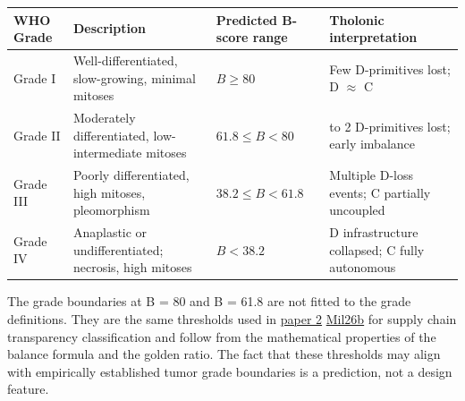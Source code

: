 \documentclass[
  11pt,
  letterpaper,
]{article}
\begin{document}
\begin{longtable}[]{@{}
  >{\raggedright\arraybackslash}p{}
  >{\raggedright\arraybackslash}p{}
  >{\raggedright\arraybackslash}p{}
  >{\raggedright\arraybackslash}p{}@{}}
\toprule\noalign{}
\begin{minipage}[b]{\linewidth}\raggedright
WHO Grade
\end{minipage} & \begin{minipage}[b]{\linewidth}\raggedright
Description
\end{minipage} & \begin{minipage}[b]{\linewidth}\raggedright
Predicted B-score range
\end{minipage} & \begin{minipage}[b]{\linewidth}\raggedright
Tholonic interpretation
\end{minipage} \\
\midrule\noalign{}
\endhead
\bottomrule\noalign{}
\endlastfoot
Grade I & Well-differentiated, slow-growing, minimal mitoses &
\(B \geq 80\) & Few D-primitives lost; D \(\approx\) C \\
Grade II & Moderately differentiated, low-intermediate mitoses &
\(61.8 \leq B < 80\) & 1 to 2 D-primitives lost; early imbalance \\
Grade III & Poorly differentiated, high mitoses, pleomorphism &
\(38.2 \leq B < 61.8\) & Multiple D-loss events; C partially
uncoupled \\
Grade IV & Anaplastic or undifferentiated; necrosis, high mitoses &
\(B < 38.2\) & D infrastructure collapsed; C fully autonomous \\
\end{longtable}

The grade boundaries at B = 80 and B = 61.8 are not fitted to the grade
definitions. They are the same thresholds used in
\href{https://github.com/baardev/truevalue/blob/main/docnav/Research/papers/2_supply-chain-transparency-tvpci/2_supply-chain-transparency-tvpci.pdf}{paper
2}
\href{https://github.com/baardev/truevalue/blob/main/docnav/Research/papers/2_supply-chain-transparency-tvpci/2_supply-chain-transparency-tvpci.pdf}{Mil26b}
for supply chain transparency classification and follow from the
mathematical properties of the balance formula and the golden ratio. The
fact that these thresholds may align with empirically established tumor
grade boundaries is a prediction, not a design feature.
\end{document}
